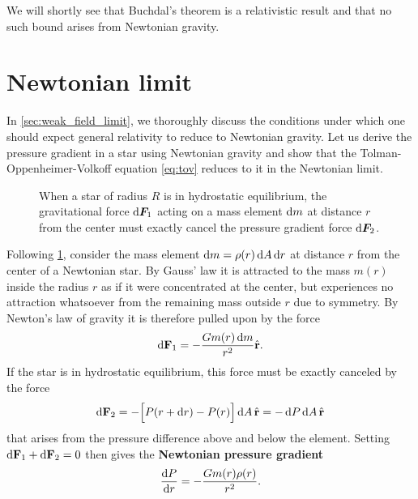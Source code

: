 We will shortly see that Buchdal's theorem is a relativistic result and that no such bound arises from Newtonian gravity.

\section{Newtonian limit}

In \cref{sec:weak_field_limit}, we thoroughly discuss the conditions under which one should expect general relativity to reduce to Newtonian gravity.
Let us derive the pressure gradient in a star using Newtonian gravity and show that the Tolman-Oppenheimer-Volkoff equation \eqref{eq:tov} reduces to it in the Newtonian limit.

\begin{figure}
\centering
{}
\caption{\label{fig:hydrostatic_equilibrium_sphere}When a star of radius $R$ is in hydrostatic equilibrium, the gravitational force $\mathop{}\!\mathrm{d} {\bm{F}}_1$ acting on a mass element  $\mathop{}\!\mathrm{d} m$ at distance $r$ from the center must exactly cancel the pressure gradient force $\mathop{}\!\mathrm{d} {\bm{F}}_2$.}
\end{figure}

Following \cref{fig:hydrostatic_equilibrium_sphere}, consider the mass element $\mathop{}\!\mathrm{d} m = \rho(r) \mathop{}\!\mathrm{d} A \mathop{}\!\mathrm{d} r$ at distance $r$ from the center of a Newtonian star.
By Gauss' law it is attracted to the mass $m(r)$ inside the radius $r$ as if it were concentrated at the center, but experiences no attraction whatsoever from the remaining mass outside $r$ due to symmetry.
By Newton's law of gravity it is therefore pulled upon by the force
\begin{equation}
	\mathop{}\!\mathrm{d} \mathbf{F}_1 = -\frac{G m(r) \mathop{}\!\mathrm{d} m}{r^2} \hat{\textbf{r}} .
	\label{eq:weak_field_limit:force_newton}
\end{equation}
If the star is in hydrostatic equilibrium, this force must be exactly canceled by the force
\begin{equation}
	\mathop{}\!\mathrm{d} \textbf{F}_2 = - \Big[ P(r + \mathop{}\!\mathrm{d} r) - P(r) \Big] \mathop{}\!\mathrm{d} A \, \hat{\textbf{r}} = -\mathop{}\!\mathrm{d} P \mathop{}\!\mathrm{d} A \, \hat{\textbf{r}}
	\label{eq:weak_field_limit:force_pressure}
\end{equation}
that arises from the pressure difference above and below the element.
Setting $\mathop{}\!\mathrm{d} \textbf{F}_1 + \mathop{}\!\mathrm{d} \textbf{F}_2 = 0$ then gives the \textbf{Newtonian pressure gradient}
\begin{equation}
	\odv{P}{r} = -\frac{G m(r) \rho(r)}{r^2} .
	\label{eq:weak_field_limit:newtonian_pressure_gradient}
\end{equation}

